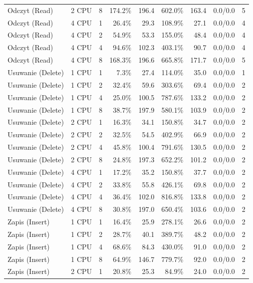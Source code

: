 \begin{table}[ht]
{\begin{tabular}{llcrrrrcc}
Odczyt (Read) & 2 CPU & 8 & 174.2\% & 196.4 & 602.0\% & 163.4 & 0.0/0.0 & 5 \\
Odczyt (Read) & 4 CPU & 1 & 26.4\% & 29.3 & 108.9\% & 27.1 & 0.0/0.0 & 4 \\
Odczyt (Read) & 4 CPU & 2 & 54.9\% & 53.3 & 155.0\% & 48.4 & 0.0/0.0 & 4 \\
Odczyt (Read) & 4 CPU & 4 & 94.6\% & 102.3 & 403.1\% & 90.7 & 0.0/0.0 & 4 \\
Odczyt (Read) & 4 CPU & 8 & 168.3\% & 196.6 & 665.8\% & 171.7 & 0.0/0.0 & 5 \\
Usuwanie (Delete) & 1 CPU & 1 & 7.3\% & 27.4 & 114.0\% & 35.0 & 0.0/0.0 & 1 \\
Usuwanie (Delete) & 1 CPU & 2 & 32.4\% & 59.6 & 303.6\% & 69.4 & 0.0/0.0 & 2 \\
Usuwanie (Delete) & 1 CPU & 4 & 25.0\% & 100.5 & 787.6\% & 133.2 & 0.0/0.0 & 2 \\
Usuwanie (Delete) & 1 CPU & 8 & 38.7\% & 197.9 & 580.1\% & 103.9 & 0.0/0.0 & 2 \\
Usuwanie (Delete) & 2 CPU & 1 & 16.3\% & 34.1 & 150.8\% & 34.7 & 0.0/0.0 & 2 \\
Usuwanie (Delete) & 2 CPU & 2 & 32.5\% & 54.5 & 402.9\% & 66.9 & 0.0/0.0 & 2 \\
Usuwanie (Delete) & 2 CPU & 4 & 45.8\% & 100.4 & 791.6\% & 130.5 & 0.0/0.0 & 2 \\
Usuwanie (Delete) & 2 CPU & 8 & 24.8\% & 197.3 & 652.2\% & 101.2 & 0.0/0.0 & 2 \\
Usuwanie (Delete) & 4 CPU & 1 & 17.2\% & 35.2 & 150.8\% & 37.7 & 0.0/0.0 & 2 \\
Usuwanie (Delete) & 4 CPU & 2 & 33.8\% & 55.8 & 426.1\% & 69.8 & 0.0/0.0 & 2 \\
Usuwanie (Delete) & 4 CPU & 4 & 36.4\% & 102.0 & 816.8\% & 133.8 & 0.0/0.0 & 2 \\
Usuwanie (Delete) & 4 CPU & 8 & 30.8\% & 197.0 & 650.4\% & 103.6 & 0.0/0.0 & 2 \\
Zapis (Insert) & 1 CPU & 1 & 16.4\% & 25.9 & 278.1\% & 26.6 & 0.0/0.0 & 2 \\
Zapis (Insert) & 1 CPU & 2 & 28.7\% & 40.1 & 389.7\% & 48.2 & 0.0/0.0 & 2 \\
Zapis (Insert) & 1 CPU & 4 & 68.6\% & 84.3 & 430.0\% & 91.0 & 0.0/0.0 & 2 \\
Zapis (Insert) & 1 CPU & 8 & 64.9\% & 146.7 & 779.7\% & 92.0 & 0.0/0.0 & 2 \\
Zapis (Insert) & 2 CPU & 1 & 20.8\% & 25.3 & 84.9\% & 24.0 & 0.0/0.0 & 2 \\

\end{tabular}}
\end{table}
